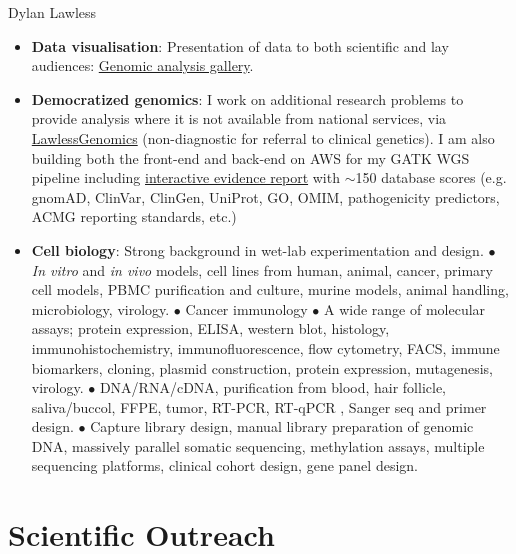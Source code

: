 \documentclass[11pt,a4paper]{article}
\begin{document}
\begin{cv}{Dylan Lawless}
\begin{itemize}[leftmargin=*]
\item \textbf{Data visualisation}: Presentation of data to both scientific and lay audiences: \href{https://lawlessgenomics.com/portfolio}{Genomic analysis gallery}.  

\item \textbf{Democratized genomics}: I work on additional research problems to provide analysis where it is not available from national services, via \href{https://lawlessgenomics.com}{LawlessGenomics} (non-diagnostic for referral to clinical genetics). I am also building both the front-end and back-end on AWS for my GATK WGS pipeline including \href{https://lawlessgenomics.com/topic/evidence_builder.html}{interactive evidence report} with $\sim$150 database scores (e.g. gnomAD, ClinVar, ClinGen, UniProt, GO, OMIM, pathogenicity predictors, ACMG reporting standards, etc.)

\item \textbf{Cell biology}: Strong background in wet-lab experimentation and design.
$\bullet$ \textit{In vitro} and \textit{in vivo} models,
cell lines from human, animal, cancer, primary cell models, PBMC purification and culture, murine models, animal handling, microbiology, virology.
$\bullet$ Cancer immunology
$\bullet$ A wide range of molecular assays; protein expression, ELISA, western blot, histology, immunohistochemistry, immunofluorescence, flow cytometry, FACS, immune biomarkers, 
cloning, plasmid construction, protein expression, mutagenesis, virology.
$\bullet$ DNA/RNA/cDNA, purification from blood, hair follicle, saliva/buccol, FFPE, tumor, RT-PCR, RT-qPCR , Sanger seq and primer design.
$\bullet$ Capture library design, manual library preparation of genomic DNA, 
massively parallel somatic sequencing, methylation assays, multiple sequencing platforms, 
clinical cohort design, gene panel design.
\end{itemize}

\section*{Scientific Outreach}


\end{cv}
\end{document}
